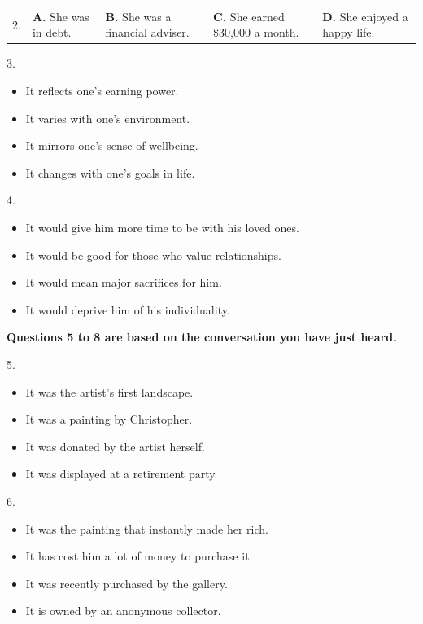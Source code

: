 \documentclass[UTF8,11pt]{ctexart}
\begin{document}
\noindent\begin{tabularx}{\linewidth}{@{}lXXXX@{}}2. & \textbf{A.} She was in debt. & \textbf{B.} She was a financial adviser. & \textbf{C.} She earned \$30,000 a month. & \textbf{D.} She enjoyed a happy life.\\\end{tabularx}\par

3.


\begin{itemize}[leftmargin=2em,itemsep=.2em,topsep=.4em]\item[A.] It reflects one’s earning power.
\item[B.] It varies with one’s environment.
\item[C.] It mirrors one’s sense of wellbeing.
\item[D.] It changes with one’s goals in life.
\end{itemize}

4.


\begin{itemize}[leftmargin=2em,itemsep=.2em,topsep=.4em]\item[A.] It would give him more time to be with his loved ones.
\item[B.] It would be good for those who value relationships.
\item[C.] It would mean major sacrifices for him.
\item[D.] It would deprive him of his individuality.
\end{itemize}

\textbf{Questions 5 to 8 are based on the conversation you have just heard.}


5.


\begin{itemize}[leftmargin=2em,itemsep=.2em,topsep=.4em]\item[A.] It was the artist’s first landscape.
\item[B.] It was a painting by Christopher.
\item[C.] It was donated by the artist herself.
\item[D.] It was displayed at a retirement party.
\end{itemize}

6.


\begin{itemize}[leftmargin=2em,itemsep=.2em,topsep=.4em]\item[A.] It was the painting that instantly made her rich.
\item[B.] It has cost him a lot of money to purchase it.
\item[C.] It was recently purchased by the gallery.
\item[D.] It is owned by an anonymous collector.
\end{itemize}
\end{document}

